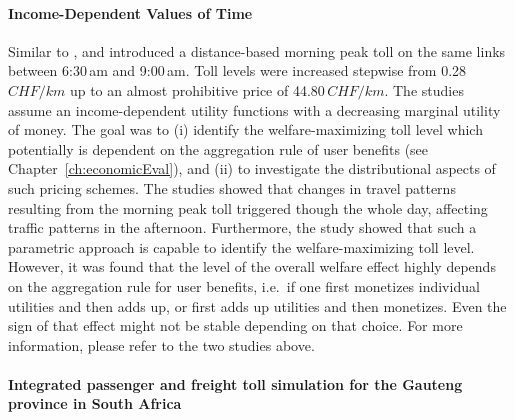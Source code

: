 \paragraph{Income-Dependent Values of Time}

Similar to \cite{RieserEtAl_TRBTDF_2008}, \cite{KickhoeferEtAl2010EconomicEvaluationPublicAcceptanceRoadPricingKuhmo} and \cite{Kickhoefer_PhDThesis_2014} introduced a distance-based morning peak toll on the same links between 6:30\,am and 9:00\,am. Toll levels were increased stepwise from 0.28\,$CHF/km$ up to an almost prohibitive price of 44.80\,$CHF/km$. The studies assume an income-dependent utility functions with a decreasing marginal utility of money. The goal was to (i) identify the welfare-maximizing toll level which potentially is dependent on the aggregation rule of user benefits (see Chapter~\ref{ch:economicEval}), and (ii) to investigate the distributional aspects of such pricing schemes.
%
The studies showed that changes in travel patterns resulting from the morning peak toll triggered though the whole day, affecting traffic patterns in the afternoon.
%
Furthermore, the study showed that such a parametric approach is capable to identify the welfare-maximizing toll level. However, it was found that the level of the overall welfare effect highly depends on the aggregation rule for user benefits, i.e.\ if one first monetizes individual utilities and then adds up, or first adds up utilities and then monetizes. 
Even the sign of that effect might not be stable depending on that choice.
%
For more information, please refer to the two studies above.



\paragraph{Integrated passenger and freight toll simulation for the Gauteng province in South Africa}

